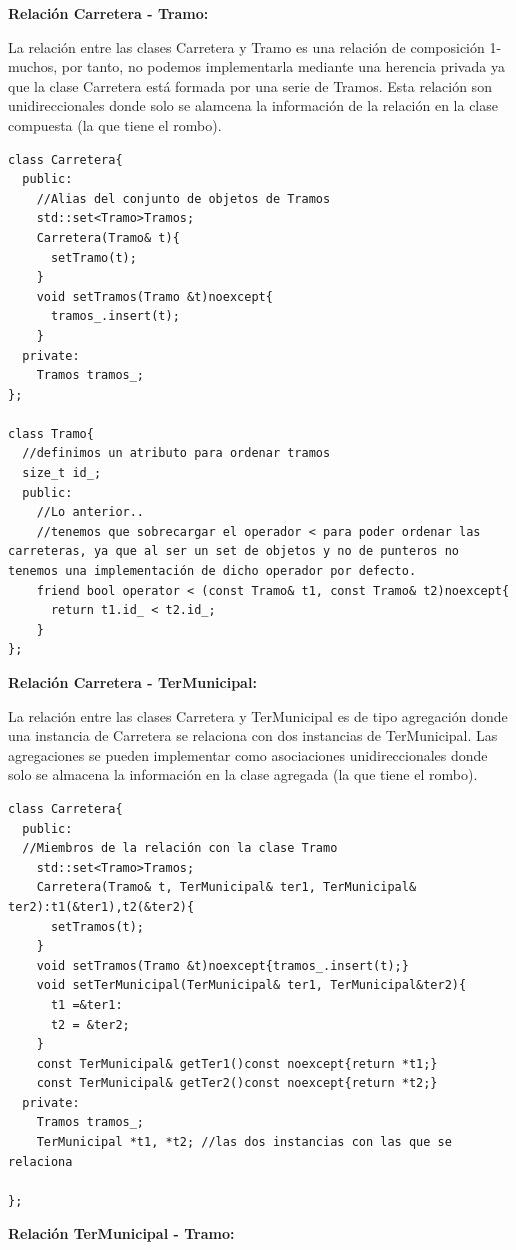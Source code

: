 \textbf{Relación Carretera - Tramo:}

La relación entre las clases Carretera y Tramo es una relación de composición 1-muchos, por tanto, no podemos implementarla mediante una herencia privada ya que la clase Carretera está formada por una serie de Tramos.
Esta relación son unidireccionales donde solo se alamcena la información de la relación en la clase compuesta (la que tiene el rombo).

\begin{verbatim}
class Carretera{
  public:
    //Alias del conjunto de objetos de Tramos
    std::set<Tramo>Tramos;
    Carretera(Tramo& t){
      setTramo(t);
    }
    void setTramos(Tramo &t)noexcept{
      tramos_.insert(t);
    }
  private:
    Tramos tramos_;
};

class Tramo{
  //definimos un atributo para ordenar tramos
  size_t id_;
  public:
    //Lo anterior..
    //tenemos que sobrecargar el operador < para poder ordenar las carreteras, ya que al ser un set de objetos y no de punteros no tenemos una implementación de dicho operador por defecto.
    friend bool operator < (const Tramo& t1, const Tramo& t2)noexcept{
      return t1.id_ < t2.id_;
    }
};
\end{verbatim}
\newpage
\textbf{Relación Carretera - TerMunicipal:}

La relación entre las clases Carretera y TerMunicipal es de tipo agregación donde una instancia de Carretera se relaciona con dos instancias de TerMunicipal.
Las agregaciones se pueden implementar como asociaciones unidireccionales donde solo se almacena la información en la clase agregada (la que tiene el rombo).

\begin{verbatim}
class Carretera{
  public:
  //Miembros de la relación con la clase Tramo
    std::set<Tramo>Tramos;
    Carretera(Tramo& t, TerMunicipal& ter1, TerMunicipal& ter2):t1(&ter1),t2(&ter2){
      setTramos(t);
    }
    void setTramos(Tramo &t)noexcept{tramos_.insert(t);}
    void setTerMunicipal(TerMunicipal& ter1, TerMunicipal&ter2){
      t1 =&ter1:
      t2 = &ter2;
    }
    const TerMunicipal& getTer1()const noexcept{return *t1;}
    const TerMunicipal& getTer2()const noexcept{return *t2;}
  private:
    Tramos tramos_;
    TerMunicipal *t1, *t2; //las dos instancias con las que se relaciona

};
\end{verbatim}

\textbf{Relación TerMunicipal - Tramo:}

